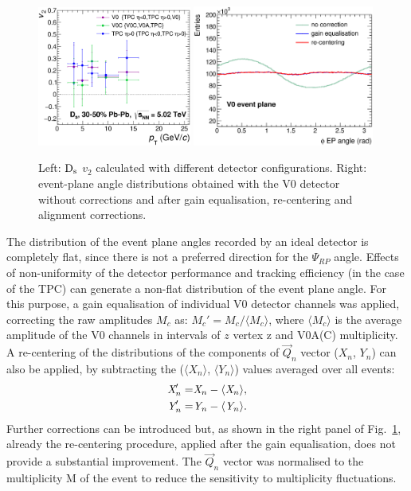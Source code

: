 \begin{figure}
\centering
  \includegraphics[width=0.45\textwidth]{FigCap5/v2_diffDetComparison.eps}
 \includegraphics[width=0.53\textwidth]{FigCap5/V0EvPlaneDitrib.eps}
 \caption{Left: ${\rm D_s}$ $v_2$ calculated with different detector configurations. Right: event-plane angle distributions obtained with the V0 detector without corrections and after gain equalisation, re-centering and alignment corrections.}
   \label{fig:QoverMCalibration}
\end{figure}



The distribution of the event plane angles recorded by an ideal detector is completely
flat, since there is not a preferred direction for the $\Psi_{RP}$ angle.
Effects of non-uniformity of the detector performance and tracking efficiency (in the case of the TPC) 
can generate a non-flat distribution of the event plane angle. 
For this purpose, a gain equalisation of individual 
V0 detector channels was applied, correcting the raw amplitudes $M_c$ 
as: $M_c' = M_c / \langle M_c \rangle$, where $\langle M_c \rangle$ is the average amplitude
of the V0 channels in intervals of $z$ vertex z and V0A(C) multiplicity. 
A re-centering of the distributions of the components
of $\vec{Q}_n$ vector ($X_n$, $Y_n$) can also be applied, by subtracting
the ($\langle X_n\rangle$, $\langle Y_n \rangle$) values averaged over all events:
\begin{equation}
\begin{split}
\emph{{X}}_n' =& \emph{X}_n - \langle \emph{X}_n \rangle,\\
\emph{{Y}}_n' = &\emph{Y}_n - \langle \emph{Y}_n \rangle.
\end{split}
\end{equation}
Further corrections can be introduced but, as shown in the right panel of 
Fig.~\ref{fig:QoverMCalibration}, already the re-centering
procedure, applied after the gain equalisation, does not provide a substantial improvement.
The $\vec{Q}_n$ vector was normalised to the
multiplicity M of the event to reduce the sensitivity to multiplicity
fluctuations. 


